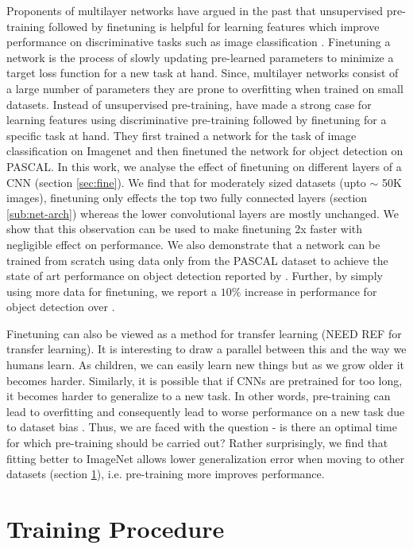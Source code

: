 \documentclass[runningheads]{llncs}
\begin{document}
Proponents of multilayer networks have argued in the past that unsupervised pre-training followed by finetuning is helpful for learning features which improve performance on discriminative tasks such as image classification \cite{GoogleCat, DeepPre, HintonPre}. Finetuning a network is the process of slowly updating pre-learned parameters to minimize a target loss function for a new task at hand. Since, multilayer networks consist of a large number of parameters they are prone to overfitting when trained on small datasets. Instead of unsupervised pre-training, \cite{Decaf, Rcnn} have made a strong case for learning features using discriminative pre-training followed by finetuning for a specific task at hand. They first trained a network for the task of image classification on Imagenet and then finetuned the network for object detection on PASCAL. In this work, we analyse the effect of finetuning on different layers of a CNN (section \ref{sec:fine}). We find that for moderately sized datasets (upto $\sim$ 50K images), finetuning only effects the top two fully connected layers (section \ref{sub:net-arch}) whereas the lower convolutional layers are mostly unchanged. We show that this observation can be used to make finetuning 2x faster with negligible effect on performance. We also demonstrate that a network can be trained from scratch using data only from the PASCAL dataset to achieve the state of art performance on object detection reported by \cite{Rcnn}. Further, by simply using more data for finetuning, we report a $10\%$ increase in performance for object detection over \cite{Rcnn}. 

Finetuning can also be viewed as a method for transfer learning (NEED REF for transfer learning). It is interesting to draw a parallel between this and the way we humans learn. As children, we can easily learn new things but as we grow older it becomes harder. Similarly, it is possible that if CNNs are pretrained for too long, it becomes harder to generalize to a new task. In other words, pre-training can lead to overfitting and consequently lead to worse performance on a new task due to dataset bias \cite{datasetBias}. Thus, we are faced with the question - is there an optimal time for which pre-training should be carried out? Rather surprisingly, we find that fitting better to ImageNet allows lower generalization error when moving to other datasets (section \ref{sec:train}), i.e. pre-training more improves performance.

\section{Training Procedure}
\label{sec:train}
\end{document}
